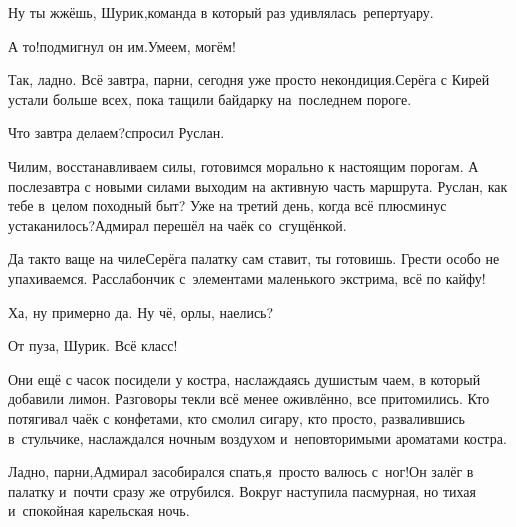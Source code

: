 
\diagdash Ну ты жжёшь, Шурик,\mdash команда в который раз удивлялась~репертуару.

\diagdash А то!\mdash подмигнул он им.\mdash Умеем, могём!

\diagdash Так, ладно. Всё завтра, парни, сегодня уже просто некондиция.\mdash Серёга с Кирей устали больше всех, пока тащили байдарку на~последнем пороге.

\diagdash Что завтра делаем?\mdash спросил Руслан.

\diagdash Чилим, восстанавливаем силы, готовимся морально к настоящим порогам. А послезавтра с новыми силами выходим на активную часть маршрута. Руслан, как тебе в~целом походный быт? Уже на третий  день, когда всё плюс\sdash минус устаканилось?\mdash Адмирал перешёл на чаёк со~сгущёнкой.

\diagdash Да так\sdash то ваще на чиле\mdash Серёга палатку сам ставит, ты готовишь. Грести особо не упахиваемся. Расслабончик с~элементами маленького экстрима, всё по кайфу!

\diagdash Ха, ну примерно да. Ну чё, орлы, наелись?

\diagdash От пуза, Шурик. Всё класс!

Они ещё с часок посидели у костра, наслаждаясь душистым чаем, в который добавили лимон. Разговоры текли всё менее оживлённо, все притомились. Кто потягивал чаёк с конфетами, кто смолил сигару, кто просто, развалившись в~стульчике, наслаждался ночным воздухом и~неповторимыми ароматами костра.

\diagdash Ладно, парни,\mdash Адмирал засобирался спать,\mdash я~просто валюсь с~ног!\mdash Он залёг в палатку и~почти сразу же отрубился. Вокруг наступила пасмурная, но тихая и~спокойная карельская ночь.


\vspace{-0.2cm}
\begin{center}
\end{center}
